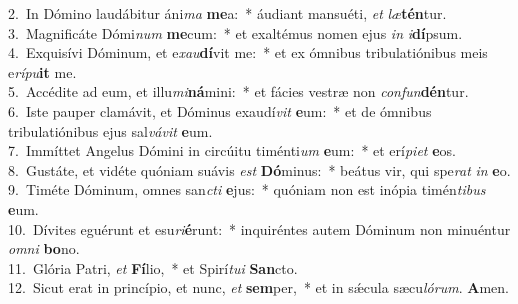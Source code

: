 {2.~}In Dómino laudábitur áni\textit{ma} \textbf{me}a:~* áudiant mansuéti, \textit{et} \textit{læ}\textbf{tén}tur.\\
{3.~}Magnificáte Dómi\textit{num} \textbf{me}cum:~* et exaltémus nomen ejus \textit{in} \textit{i}\textbf{dí}psum.\\
{4.~}Exquisívi Dóminum, et e\textit{xau}\textbf{dí}vit me:~* et ex ómnibus tribulatiónibus meis e\textit{rí}\textit{pu}\textbf{it} me.\\
{5.~}Accédite ad eum, et illu\textit{mi}\textbf{ná}mini:~* et fácies vestræ non \textit{con}\textit{fun}\textbf{dén}tur.\\
{6.~}Iste pauper clamávit, et Dóminus exaudí\textit{vit} \textbf{e}um:~* et de ómnibus tribulatiónibus ejus sal\textit{vá}\textit{vit} \textbf{e}um.\\
{7.~}Immíttet Angelus Dómini in circúitu timénti\textit{um} \textbf{e}um:~* et erí\textit{pi}\textit{et} \textbf{e}os.\\
{8.~}Gustáte, et vidéte quóniam suávis \textit{est} \textbf{Dó}minus:~* beátus vir, qui spe\textit{rat} \textit{in} \textbf{e}o.\\
{9.~}Timéte Dóminum, omnes san\textit{cti} \textbf{e}jus:~* quóniam non est inópia timén\textit{ti}\textit{bus} \textbf{e}um.\\
{10.~}Dívites eguérunt et esu\textit{ri}\textbf{é}runt:~* inquiréntes autem Dóminum non minuéntur \textit{om}\textit{ni} \textbf{bo}no.\\
{11.~}Glória Patri, \textit{et} \textbf{Fí}lio,~* et Spirí\textit{tu}\textit{i} \textbf{San}cto.\\
{12.~}Sicut erat in princípio, et nunc, \textit{et} \textbf{sem}per,~* et in sǽcula sæcu\textit{ló}\textit{rum}. \textbf{A}men.\\
